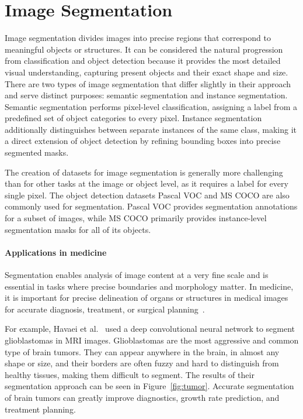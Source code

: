 \section{Image Segmentation}
Image segmentation divides images into precise regions that correspond to meaningful objects or structures. It can be considered the natural progression from classification and object detection because it provides the most detailed visual understanding, capturing present objects and their exact shape and size. There are two types of image segmentation that differ slightly in their approach and serve distinct purposes: semantic segmentation and instance segmentation. Semantic segmentation performs pixel-level classification, assigning a label from a predefined set of object categories to every pixel. Instance segmentation additionally distinguishes between separate instances of the same class, making it a direct extension of object detection by refining bounding boxes into precise segmented masks.~\cite{Minaee2022}

The creation of datasets for image segmentation is generally more challenging than for other tasks at the image or object level, as it requires a label for every single pixel. The object detection datasets Pascal VOC and MS COCO are also commonly used for segmentation. Pascal VOC provides segmentation annotations for a subset of images, while MS COCO primarily provides instance-level segmentation masks for all of its objects.

\paragraph{Applications in medicine} Segmentation enables analysis of image content at a very fine scale and is essential in tasks where precise boundaries and morphology matter. In medicine, it is important for precise delineation of organs or structures in medical images for accurate diagnosis, treatment, or surgical planning~\cite{Aljuaid2022}.

For example, Havaei et al.~\cite{Havaei2017} used a deep convolutional neural network to segment glioblastomas in MRI images. Glioblastomas are the most aggressive and common type of brain tumors. They can appear anywhere in the brain, in almost any shape or size, and their borders are often fuzzy and hard to distinguish from healthy tissues, making them difficult to segment. The results of their segmentation approach can be seen in Figure~\ref{fig:tumor}. Accurate segmentation of brain tumors can greatly improve diagnostics, growth rate prediction, and treatment planning.

